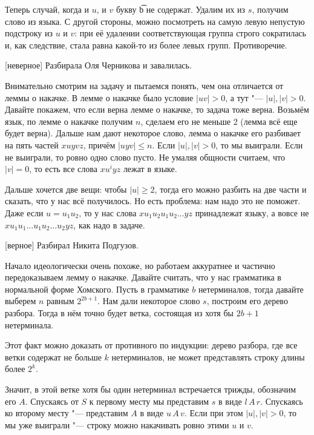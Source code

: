 	Теперь случай, когда и $u$, и $v$ букву \t{b} не содержат.
	Удалим их из $s$, получим слово из языка.
	С другой стороны, можно посмотреть на самую левую непустую подстроку из $u$ и $v$:
	при её удалении соответствующая группа строго сократилась и, как следствие, стала равна какой-то
	из более левых групп.
	Противоречие.

[неверное]\label{prob32_wrong}
	Разбирала Оля Черникова и завалилась.

	Внимательно смотрим на задачу и пытаемся понять, чем она отличается от леммы о накачке.
	В лемме о накачке было условие $|uv|>0$, а тут "--- $|u|, |v|>0$.
	Давайте покажем, что если верна лемме о накачке, то задача тоже верна.
	Возьмём язык, по лемме о накачке получим $n$, сделаем его не меньше 2 (лемма всё еще будет верна).
	Дальше нам дают некоторое слово, лемма о накачке его разбивает на пять частей $xuyvz$, причём $|uyv| \le n$.
	Если $|u|, |v|>0$, то мы выиграли.
	Если не выиграли, то ровно одно слово пусто.
	Не умаляя общности считаем, что $|v|=0$, то есть все слова $xu^iyz$ лежат в языке.

	Дальше хочется две вещи: чтобы $|u|\ge2$, тогда его можно разбить на две части и сказать,
	что у нас всё получилось.
	Но есть проблема: нам надо это не поможет.
	Даже если $u=u_1u_2$, то у нас слова $xu_1u_2u_1u_2\dots yz$
	принадлежат языку, а вовсе не $xu_1u_1\dots u_1u_2\dots u_2 yz$, как надо в задаче.

[верное]\label{prob32}
	Разбирал Никита Подгузов.

	Начало идеологически очень похоже, но работаем аккуратнее и частично передоказываем лемму о накачке.
	Давайте считать, что у нас грамматика в нормальной форме Хомского.
	Пусть в грамматике $b$ нетерминалов, тогда давайте выберем $n$ равным $2^{2b+1}$.
	Нам дали некоторое слово $s$, построим его дерево разбора.
	Тогда в нём точно будет ветка, состоящая из хотя бы $2b+1$ нетерминала.
	\begin{Rem}
		Этот факт можно доказать от противного по индукции: дерево разбора,
		где все ветки содержат не больше $k$ нетерминалов, не может представлять
		строку длины более $2^k$.
	\end{Rem}
	Значит, в этой ветке хотя бы один нетерминал встречается трижды, обозначим его $A$.
	Спускаясь от $S$ к первому месту мы представим $s$ в виде $l\,A\,r$.
	Спускаясь ко второму месту "--- представим $A$ в виде $u\,A\,v$.
	Если при этом $|u|, |v|>0$, то мы уже выиграли "--- строку можно накачивать ровно этими $u$ и $v$.


